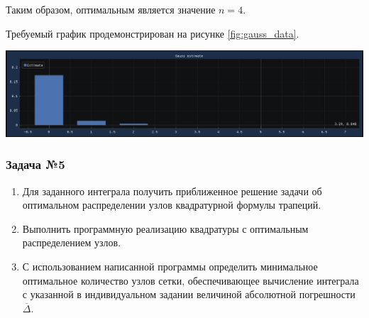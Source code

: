 \documentclass[a4paper, fontsize=14pt]{article}
\begin{document}
    Таким образом, оптимальным является значение $n = 4$. 

    Требуемый график продемонстрирован на рисунке \ref{fig:gauss_data}.
    \begin{center}
        \includegraphics[scale=0.6]{src/gauss.png}
        \label{fig:gauss_data}
    \end{center}

\subsubsection*{Задача №5}
\begin{enumerate}
    \item Для заданного интеграла получить приближенное решение задачи об
оптимальном распределении узлов квадратурной формулы трапеций.
    \item Выполнить программную реализацию квадратуры с оптимальным
распределением узлов.
    \item С использованием написанной программы определить минимальное
оптимальное количество узлов сетки, обеспечивающее вычисление
интеграла с указанной в индивидуальном задании величиной
абсолютной погрешности $\overline{\Delta}$.
\end{enumerate}
\end{document}
